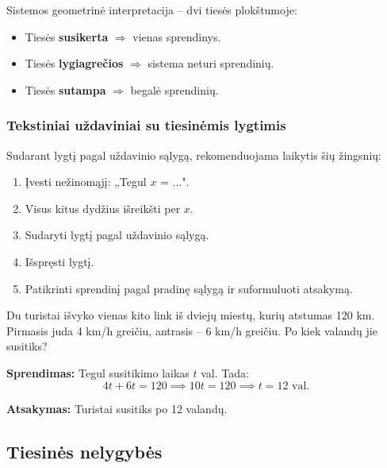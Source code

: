 \begin{tcolorbox}[title=Sistemos sprendinių atvejų apžvalga, colback=green!5, colframe=green!50!black]
Sistemos geometrinė interpretacija – dvi tiesės plokštumoje:
\begin{itemize}
    \item Tiesės \textbf{susikerta} $\Rightarrow$ vienas sprendinys.
    \item Tiesės \textbf{lygiagrečios} $\Rightarrow$ sistema neturi sprendinių.
    \item Tiesės \textbf{sutampa} $\Rightarrow$ begalė sprendinių.
\end{itemize}
\end{tcolorbox}

\subsubsection{Tekstiniai uždaviniai su tiesinėmis lygtimis}

Sudarant lygtį pagal uždavinio sąlygą, rekomenduojama laikytis šių žingsnių:
\begin{enumerate}
    \item Įvesti nežinomąjį: „Tegul $x$ = ...".
    \item Visus kitus dydžius išreikšti per $x$.
    \item Sudaryti lygtį pagal uždavinio sąlygą.
    \item Išspręsti lygtį.
    \item Patikrinti sprendinį pagal pradinę sąlygą ir suformuluoti atsakymą.
\end{enumerate}

\begin{exercise}
Du turistai išvyko vienas kito link iš dviejų miestų, kurių atstumas 120 km. Pirmasis juda 4 km/h greičiu, antrasis – 6 km/h greičiu. Po kiek valandų jie susitiks?

\textbf{Sprendimas:} Tegul susitikimo laikas $t$ val. Tada:
\[
    4t + 6t = 120 \implies 10t = 120 \implies t = 12 \text{ val.}
\]

\textbf{Atsakymas:} Turistai susitiks po 12 valandų.
\end{exercise}

\subsection{Tiesinės nelygybės}

